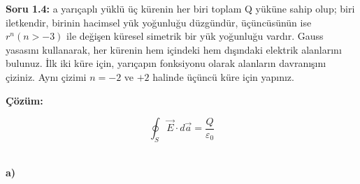 \newpage


\begin{flushleft}
   
\textbf{Soru 1.4:} a yarıçaplı yüklü üç kürenin her biri toplam Q yüküne sahip olup; biri iletkendir, birinin hacimsel yük yoğunluğu düzgündür, üçüncüsünün ise $r^{n} (n > -3)$ ile değişen küresel simetrik bir yük yoğunluğu vardır. Gauss yasasını kullanarak, her kürenin hem içindeki hem dışındaki elektrik alanlarını bulunuz. İlk iki küre için, yarıçapın fonksiyonu olarak alanların davranışını çiziniz. Aynı çizimi $n=-2$ ve $+2$ halinde üçüncü küre için yapınız.
\end{flushleft}

  
\textbf{Çözüm:}

\[ \oint_{S} \Vec{E} \cdot d \Vec{a} = \dfrac{Q}{\varepsilon_{0}}\]
\

\textbf{a)} 

